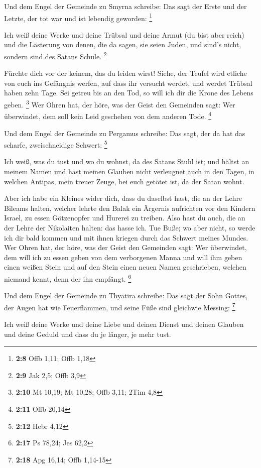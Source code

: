  Und dem Engel der Gemeinde zu Smyrna schreibe: Das sagt der
Erste und der Letzte, der tot war und ist lebendig geworden: \footnote{\textbf{2:8}
  Offb 1,11; Offb 1,18}

 Ich weiß deine Werke und deine Trübsal und deine Armut (du
bist aber reich) und die Lästerung von denen, die da sagen, sie seien
Juden, und sind's nicht, sondern sind des Satans Schule. \footnote{\textbf{2:9}
  Jak 2,5; Offb 3,9}

 Fürchte dich vor der keinem, das du leiden wirst! Siehe,
der Teufel wird etliche von euch ins Gefängnis werfen, auf dass ihr
versucht werdet, und werdet Trübsal haben zehn Tage. Sei getreu bis an
den Tod, so will ich dir die Krone des Lebens geben. \footnote{\textbf{2:10}
  Mt 10,19; Mt 10,28; Offb 3,11; 2Tim 4,8}  Wer Ohren hat,
der höre, was der Geist den Gemeinden sagt: Wer überwindet, dem soll
kein Leid geschehen von dem anderen Tode. \footnote{\textbf{2:11} Offb
  20,14}

 Und dem Engel der Gemeinde zu Pergamus schreibe: Das sagt,
der da hat das scharfe, zweischneidige Schwert: \footnote{\textbf{2:12}
  Hebr 4,12}

 Ich weiß, was du tust und wo du wohnst, da des Satans
Stuhl ist; und hältst an meinem Namen und hast meinen Glauben nicht
verleugnet auch in den Tagen, in welchen Antipas, mein treuer Zeuge, bei
euch getötet ist, da der Satan wohnt.

 Aber ich habe ein Kleines wider dich, dass du daselbst
hast, die an der Lehre Bileams halten, welcher lehrte den Balak ein
Ärgernis aufrichten vor den Kindern Israel, zu essen Götzenopfer und
Hurerei zu treiben.  Also hast du auch, die an der Lehre
der Nikolaiten halten: das hasse ich.  Tue Buße; wo aber
nicht, so werde ich dir bald kommen und mit ihnen kriegen durch das
Schwert meines Mundes.  Wer Ohren hat, der höre, was der
Geist den Gemeinden sagt: Wer überwindet, dem will ich zu essen geben
von dem verborgenen Manna und will ihm geben einen weißen Stein und auf
den Stein einen neuen Namen geschrieben, welchen niemand kennt, denn der
ihn empfängt. \footnote{\textbf{2:17} Ps 78,24; Jes 62,2}

 Und dem Engel der Gemeinde zu Thyatira schreibe: Das sagt
der Sohn Gottes, der Augen hat wie Feuerflammen, und seine Füße sind
gleichwie Messing: \footnote{\textbf{2:18} Apg 16,14; Offb 1,14-15}

 Ich weiß deine Werke und deine Liebe und deinen Dienst und
deinen Glauben und deine Geduld und dass du je länger, je mehr tust.

